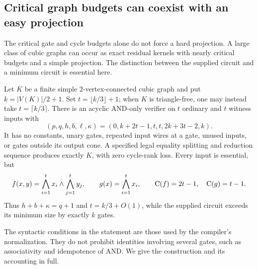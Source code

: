 \subsection{Critical graph budgets can coexist with an easy projection}
\label{sec:kernel-realization}

The critical gate and cycle budgets alone do not force a hard
projection. A large class of cubic graphs can occur as exact residual
kernels with nearly critical budgets and a simple projection. The
distinction between the supplied circuit and a minimum circuit is
essential here.

\begin{theorem}
\label{thm:kernel-realization}
Let $K$ be a finite simple 2-vertex-connected cubic graph and put
$k=|V(K)|/2+1$. Set $t=\lfloor k/3\rfloor+1$; when $K$ is
triangle-free, one may instead take $t=\lceil k/3\rceil$.
There is an acyclic AND-only verifier on $t$ ordinary and $t$ witness
inputs with
\[
 (p,q,h,b,\ell,\kappa)
   =(0,k+2t-1,t,t,2k+3t-2,k).
\]
It has no constants, unary gates, repeated input wires at a gate,
unused inputs, or gates outside its output cone. A specified legal
equality splitting and reduction sequence produces exactly $K$, with
zero cycle-rank loss. Every input is essential, but
\[
 f(x,y)=\bigwedge_{i=1}^{t}x_i\land\bigwedge_{j=1}^{t}y_j,
 \qquad g(x)=\bigwedge_{i=1}^{t}x_i,
 \qquad \mathrm{C}(f)=2t-1,\quad \mathrm{C}(g)=t-1.
\]
Thus $h+b+\kappa=q+1$ and $t=k/3+O(1)$, while the supplied
circuit exceeds its minimum size by exactly $k$ gates.
\end{theorem}

The syntactic conditions in the statement are those used by the
compiler's normalization. They do not prohibit identities involving
several gates, such as associativity and idempotence of AND.
We give the construction and its accounting in full.

